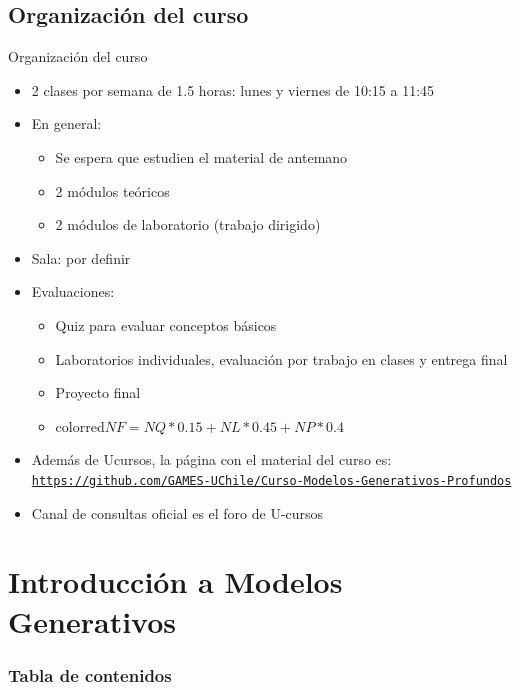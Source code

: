 \documentclass[9pt]{beamer}
\begin{document}
\subsection{Organización del curso}
\begin{frame}{Organización del curso}

\begin{itemize}
  \item 2 clases por semana de 1.5 horas: lunes y viernes de 10:15 a 11:45 
  \item En general:
  \begin{itemize}
    \item Se espera que estudien el material de antemano
    \item 2 módulos teóricos
    \item 2 módulos de laboratorio (trabajo dirigido)
  \end{itemize}
  \item Sala: por definir
  \item Evaluaciones: 
  \begin{itemize}
    \item Quiz para evaluar conceptos básicos
    \item Laboratorios individuales, evaluación por trabajo en clases y entrega final
    \item Proyecto final
    \item color{red}$NF = NQ*0.15 + NL*0.45 + NP*0.4 $\color{black}
  \end{itemize}
  \item Además de Ucursos, la página con el material del curso es: \href{https://github.com/GAMES-UChile/Curso-Modelos-Generativos-Profundos}{\tt https://github.com/GAMES-UChile/Curso-Modelos-Generativos-Profundos}
  \item Canal de consultas oficial es el foro de U-cursos
\end{itemize}

\end{frame}


\section{Introducción a Modelos Generativos}
\begin{frame}
    \frametitle{Tabla de contenidos}
    \tableofcontents[currentsection]
\end{frame}
\end{document}
